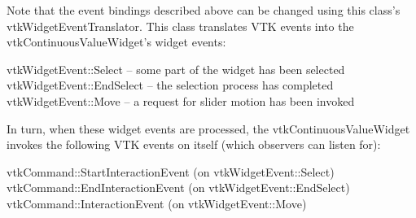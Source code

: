Note that the event bindings described above can be changed using this class's vtk\-Widget\-Event\-Translator. This class translates V\-T\-K events into the vtk\-Continuous\-Value\-Widget's widget events\-: 
\begin{DoxyPre}
   vtkWidgetEvent::Select -- some part of the widget has been selected
   vtkWidgetEvent::EndSelect -- the selection process has completed
   vtkWidgetEvent::Move -- a request for slider motion has been invoked
 \end{DoxyPre}


In turn, when these widget events are processed, the vtk\-Continuous\-Value\-Widget invokes the following V\-T\-K events on itself (which observers can listen for)\-: 
\begin{DoxyPre}
   vtkCommand::StartInteractionEvent (on vtkWidgetEvent::Select)
   vtkCommand::EndInteractionEvent (on vtkWidgetEvent::EndSelect)
   vtkCommand::InteractionEvent (on vtkWidgetEvent::Move)
 \end{DoxyPre}


